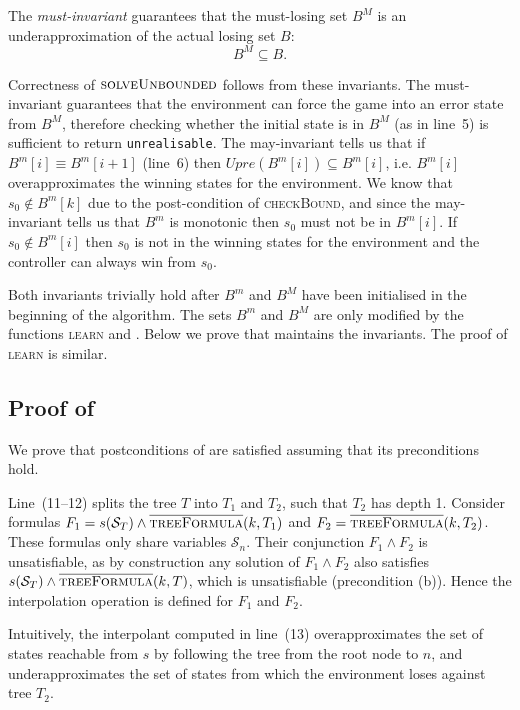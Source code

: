 The \emph{must-invariant} guarantees that the must-losing set $B^M$ is an
underapproximation of the actual losing set $B$: $$B^M \subseteq B.$$

Correctness of $\textsc{solveUnbounded}$ follows from these invariants. The
must-invariant guarantees that the environment can force the game into an error
state from $B^M$, therefore checking whether the initial state is in $B^M$ (as
in line~5) is sufficient to return \texttt{unrealisable}. The may-invariant
tells us that if $B^m[i] \equiv B^m[i+1]$ (line~6) then $Upre(B^m[i]) \subseteq
B^m[i]$, i.e. $B^m[i]$ overapproximates the winning states for the environment.
We know that $s_0 \not\in B^m[k]$ due to the post-condition of
\textsc{checkBound}, and since the may-invariant tells us that $B^m$ is
monotonic then $s_0$ must not be in $B^m[i]$. If $s_0 \not\in B^m[i]$ then $s_0$ is
not in the winning states for the environment and the controller can always win
from $s_0$. 

Both invariants trivially hold after $B^m$ and $B^M$ have been initialised in
the beginning of the algorithm. The sets $B^m$ and $B^M$ are only modified by
the functions \textsc{learn} and .  Below we prove
that  maintains the invariants.  The proof of
\textsc{learn} is similar.

\subsection{Proof of }

We prove that postconditions of \textsc{} are satisfied
assuming that its preconditions hold.

Line~(11--12) splits the tree $T$ into $T_1$ and $T_2$, such that $T_2$ has depth
1.  Consider formulas $F_1=s(\mathcal{S}_T) \land
\textsc{$\overline{\mbox{treeFormula}}$}(k, T_1)$ and $F_2 =
\textsc{$\overline{\mbox{treeFormula}}$}(k, T_2)$.  These formulas only share variables
$\mathcal{S}_n$.  Their conjunction $F_1 \land F_2$ is unsatisfiable, as by construction
any solution of $F_1 \land F_2$ also satisfies $s(\mathcal{S}_T) \land
\textsc{$\overline{\mbox{treeFormula}}$}(k, T)$, which is unsatisfiable (precondition (b)).  Hence the
interpolation operation is defined for $F_1$ and $F_2$.  

Intuitively, the interpolant computed in line~(13) overapproximates the set of
states reachable from $s$ by following the tree from the root node to $n$,
and underapproximates the set of states from which the environment loses
against tree $T_2$.  

